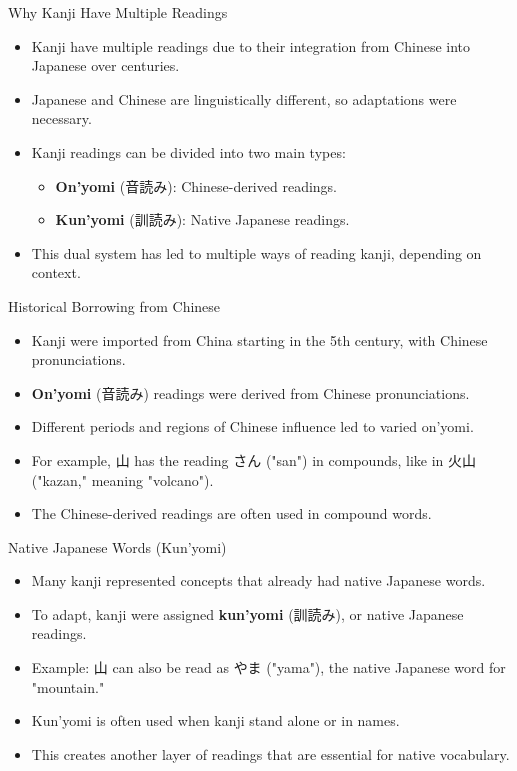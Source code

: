\documentclass[xetex]{beamer}
\begin{document}
\begin{frame}{Why Kanji Have Multiple Readings}
\begin{itemize}
    \item Kanji have multiple readings due to their integration from Chinese into Japanese over centuries.
    \item Japanese and Chinese are linguistically different, so adaptations were necessary.
    \item Kanji readings can be divided into two main types:
    \begin{itemize}
        \item \textbf{On’yomi} (\textjapanese{音読み}): Chinese-derived readings.
        \item \textbf{Kun’yomi} (\textjapanese{訓読み}): Native Japanese readings.
    \end{itemize}
    \item This dual system has led to multiple ways of reading kanji, depending on context.
\end{itemize}
\end{frame}

\begin{frame}{Historical Borrowing from Chinese}
\begin{itemize}
    \item Kanji were imported from China starting in the 5th century, with Chinese pronunciations.
    \item \textbf{On’yomi} (\textjapanese{音読み}) readings were derived from Chinese pronunciations.
    \item Different periods and regions of Chinese influence led to varied on’yomi.
    \item For example, \textjapanese{山} has the reading \textjapanese{さん} ("san") in compounds, like in \textjapanese{火山} ("kazan," meaning "volcano").
    \item The Chinese-derived readings are often used in compound words.
\end{itemize}
\end{frame}

\begin{frame}{Native Japanese Words (Kun’yomi)}
\begin{itemize}
    \item Many kanji represented concepts that already had native Japanese words.
    \item To adapt, kanji were assigned \textbf{kun’yomi} (\textjapanese{訓読み}), or native Japanese readings.
    \item Example: \textjapanese{山} can also be read as \textjapanese{やま} ("yama"), the native Japanese word for "mountain."
    \item Kun’yomi is often used when kanji stand alone or in names.
    \item This creates another layer of readings that are essential for native vocabulary.
\end{itemize}
\end{frame}
\end{document}

